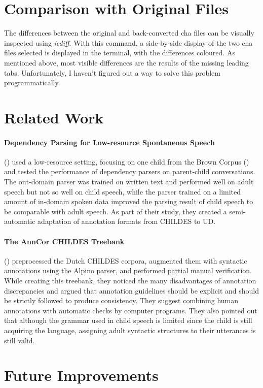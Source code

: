 \section{Comparison with Original Files}
The differences between the original and back-converted cha files can be visually inspected using \emph{icdiff}. With this command, a side-by-side display of the two cha files selected is displayed in the terminal, with the differences coloured. As mentioned above, most visible differences are the results of the missing leading tabs. Unfortunately, I haven't figured out a way to solve this problem programmatically.

\section{Related Work}

\paragraph{Dependency Parsing for Low-resource Spontaneous Speech} %
\label{par:zoey}
(\cite{liu2021}) used a low-resource setting, focusing on one child from the Brown Corpus (\cite{brown1973}) and tested the performance of dependency parsers on parent-child conversations. The out-domain parser was trained on written text and performed well on adult speech but not so well on child speech, while the parser trained on a limited amount of in-domain spoken data improved the parsing result of child speech to be comparable with adult speech. As part of their study, they created a semi-automatic adaptation of annotation formats from CHILDES to UD.

\paragraph{The AnnCor CHILDES Treebank}
(\cite{odijk2018anncor}) preprocessed the Dutch CHILDES corpora, augmented them with syntactic annotations using the Alpino parser, and performed partial manual verification. While creating this treebank, they noticed the many disadvantages of annotation discrepancies and argued that annotation guidelines should be explicit and should be strictly followed to produce consistency. They suggest combining human annotations with automatic checks by computer programs. They also pointed out that although the grammar used in child speech is limited since the child is still acquiring the language, assigning adult syntactic structures to their utterances is still valid.

\section{Future Improvements}
